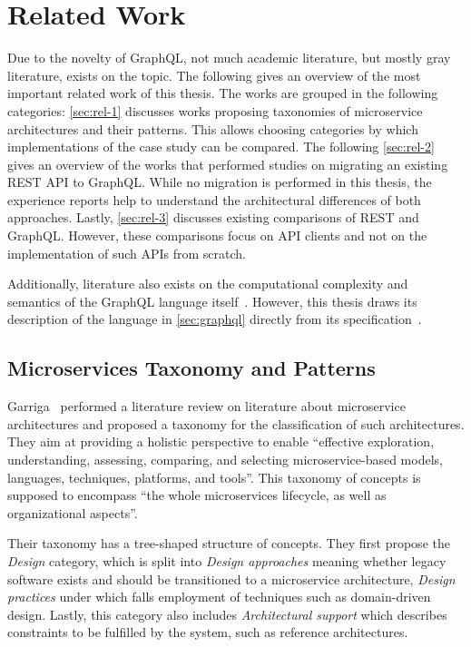 \section{Related Work}\label{sec:related}

Due to the novelty of GraphQL, not much academic literature, but mostly gray literature, exists on the topic.
The following gives an overview of the most important related work of this thesis.
The works are grouped in the following categories:
\autoref{sec:rel-1} discusses works proposing taxonomies of microservice architectures and their patterns.
This allows choosing categories by which implementations of the case study can be compared.
The following \autoref{sec:rel-2} gives an overview of the works that performed studies on migrating an existing \ac{REST} \ac{API} to GraphQL.
While no migration is performed in this thesis, the experience reports help to understand the architectural differences of both approaches.
Lastly, \autoref{sec:rel-3} discusses existing comparisons of \ac{REST} and GraphQL.
However, these comparisons focus on \ac{API} clients and not on the implementation of such \acp{API} from scratch.

Additionally, literature also exists on the computational complexity and semantics of the GraphQL language itself~\cite{Hartig2017, Hartig2018}.
However, this thesis draws its description of the language in \autoref{sec:graphql} directly from its specification~\cite{Facebook2018}.

\subsection{Microservices Taxonomy and Patterns}\label{sec:rel-1}

Garriga~\cite{Garriga2017} performed a literature review on literature about microservice architectures and proposed a taxonomy for the classification of such architectures.
They aim at providing a holistic perspective to enable ``effective exploration, understanding, assessing, comparing, and selecting microservice-based models, languages, techniques, platforms, and tools''.
This taxonomy of concepts is supposed to encompass ``the whole microservices lifecycle, as well as organizational aspects''.

Their taxonomy has a tree-shaped structure of concepts.
They first propose the \textit{Design} category, which is split into \textit{Design approaches} meaning whether legacy software exists and should be transitioned to a microservice architecture, \textit{Design practices} under which falls employment of techniques such as domain-driven design.
Lastly, this category also includes \textit{Architectural support} which describes constraints to be fulfilled by the system, such as reference architectures.

